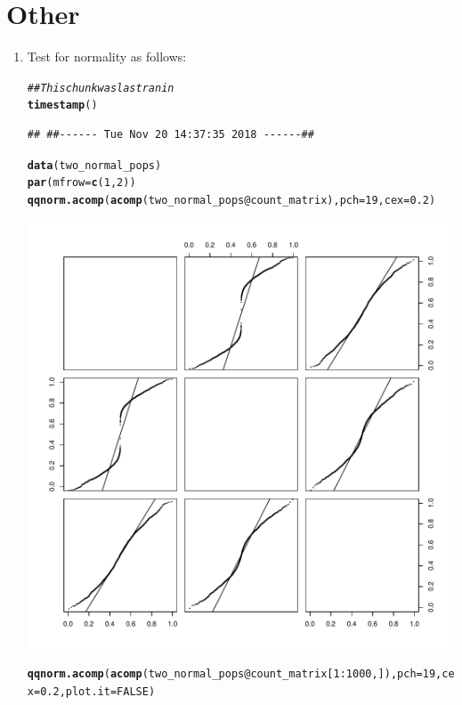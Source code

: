 \documentclass{article}\usepackage[]{graphicx}\usepackage[]{color}
\makeatletter
\def\maxwidth{ %
  \ifdim\Gin@nat@width>\linewidth
    \linewidth
  \else
    \Gin@nat@width
  \fi
}
\newcommand{\hlnum}[1]{\textcolor[rgb]{0.686,0.059,0.569}{#1}}%
\newcommand{\hlcom}[1]{\textcolor[rgb]{0.678,0.584,0.686}{\textit{#1}}}%
\newcommand{\hlopt}[1]{\textcolor[rgb]{0,0,0}{#1}}%
\newcommand{\hlstd}[1]{\textcolor[rgb]{0.345,0.345,0.345}{#1}}%
\newcommand{\hlkwc}[1]{\textcolor[rgb]{0.333,0.667,0.333}{#1}}%
\newcommand{\hlkwd}[1]{\textcolor[rgb]{0.737,0.353,0.396}{\textbf{#1}}}%
\newenvironment{kframe}{%
 \def\at@end@of@kframe{}%
 \ifinner\ifhmode%
  \def\at@end@of@kframe{\end{minipage}}%
  \begin{minipage}{\columnwidth}%
 \fi\fi%
 \def\FrameCommand##1{\hskip\@totalleftmargin \hskip-\fboxsep
 \colorbox{shadecolor}{##1}\hskip-\fboxsep
     \hskip-\linewidth \hskip-\@totalleftmargin \hskip\columnwidth}%
 \MakeFramed {\advance\hsize-\width
   \@totalleftmargin\z@ \linewidth\hsize
   \@setminipage}}%
 {\par\unskip\endMakeFramed%
 \at@end@of@kframe}
\newenvironment{knitrout}{}{} %
\makeatother
\begin{document}
\section{Other}
\begin{enumerate}
\item Test for normality as follows:
\begin{knitrout}
\color{fgcolor}\begin{kframe}
\begin{alltt}
\hlcom{## This chunk was last ran in}
\hlkwd{timestamp}\hlstd{()}
\end{alltt}
\begin{verbatim}
## ##------ Tue Nov 20 14:37:35 2018 ------##
\end{verbatim}
\begin{alltt}
\hlkwd{data}\hlstd{(two_normal_pops)}
\hlkwd{par}\hlstd{(}\hlkwc{mfrow}\hlstd{=}\hlkwd{c}\hlstd{(}\hlnum{1}\hlstd{,}\hlnum{2}\hlstd{))}
\hlkwd{qqnorm.acomp}\hlstd{(}\hlkwd{acomp}\hlstd{(two_normal_pops}\hlopt{@}\hlkwc{count_matrix}\hlstd{),} \hlkwc{pch}\hlstd{=}\hlnum{19}\hlstd{,} \hlkwc{cex}\hlstd{=}\hlnum{0.2}\hlstd{)}
\end{alltt}
\end{kframe}
\includegraphics[width=\maxwidth]{figure/unnamed-chunk-8-1} 
\begin{kframe}\begin{alltt}
\hlkwd{qqnorm.acomp}\hlstd{(}\hlkwd{acomp}\hlstd{(two_normal_pops}\hlopt{@}\hlkwc{count_matrix}\hlstd{[}\hlnum{1}\hlopt{:}\hlnum{1000}\hlstd{,]),} \hlkwc{pch}\hlstd{=}\hlnum{19}\hlstd{,} \hlkwc{cex}\hlstd{=}\hlnum{0.2}\hlstd{,} \hlkwc{plot.it}\hlstd{=}\hlnum{FALSE}\hlstd{)}
\end{alltt}



\end{kframe}
\end{knitrout}
\end{enumerate}
\end{document}

